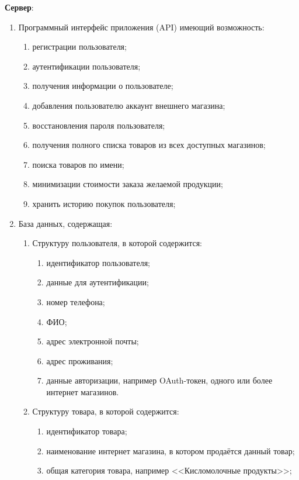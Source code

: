 \documentclass[a4paper,12pt,reqno]{article}
\begin{document}
  \noindent\textbf{Сервер}:
  \begin{enumerate}
    \item Программный интерфейс приложения (API) имеющий возможность:
    \begin{enumerate}
      \item регистрации пользователя;
      \item аутентификации пользователя; %
      \item получения информации о пользователе;
      \item добавления пользователю аккаунт внешнего магазина; %
      \item восстановления пароля пользователя;
      \item получения полного списка товаров из всех доступных магазинов;
      \item поиска товаров по имени;
      \item минимизации стоимости заказа желаемой продукции;
      \item хранить историю покупок пользователя;
    \end{enumerate}
    \item База данных, содержащая:
    \begin{enumerate}
      \item Структуру пользователя, в которой содержится:
      \begin{enumerate}
        \item идентификатор пользователя;
        \item данные для аутентификации;
        \item номер телефона;
        \item ФИО;
        \item адрес электронной почты;
        \item адрес проживания; %
        \item данные авторизации, например OAuth-токен, одного или более интернет магазинов.
      \end{enumerate}
      \item Структуру товара, в которой содержится:
      \begin{enumerate}
        \item идентификатор товара;
        \item наименование интернет магазина, в котором продаётся данный товар;
        \item общая категория товара, например <<Кисломолочные продукты>>;

\end{enumerate}
\end{enumerate}
\end{enumerate}
\end{document}
